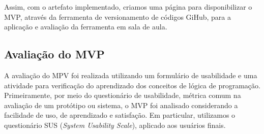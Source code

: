 
Assim, com o artefato implementado, criamos uma página para disponibilizar o MVP, através da ferramenta de versionamento de códigos GiHub, para a aplicação e avaliação da ferramenta em sala de aula.

\subsection{Avaliação do MVP}
A avaliação do MPV foi realizada utilizando um formulário de usabilidade e uma atividade para verificação do aprendizado dos conceitos de lógica de programação. Primeiramente, por meio do questionário de usabilidade, métrica comum na avaliação de um protótipo ou sistema, o MVP foi analisado considerando a facilidade de uso, de aprendizado e satisfação. Em particular, utilizamos o questionário SUS (\textit{System Usability Scale}), aplicado aos usuários finais.



